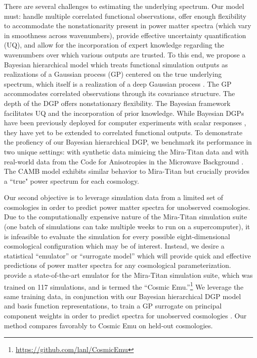 \documentclass[11pt]{article}
\begin{document}
There are several challenges to estimating the underlying spectrum.  Our model
must: handle multiple correlated functional observations, offer enough 
flexibility to accommodate the nonstationarity present in power matter spectra 
(which vary in smoothness across wavenumbers), provide effective uncertainty
quantification (UQ), and allow for the incorporation of expert knowledge 
regarding the wavenumbers over which various outputs are trusted.  To this end, 
we propose a Bayesian hierarchical model which treats functional simulation 
outputs as realizations of a Gaussian process (GP) 
centered on the true underlying spectrum, which itself is a realization of a deep Gaussian process 
\citep[DGP;][]{damianou2013deep}.  The GP accommodates correlated observations
through its covariance structure.  The depth of the DGP offers nonstationary
flexibility.  The Bayesian framework facilitates UQ and the incorporation of prior
knowledge.  While Bayesian DGPs have been previously deployed for computer experiments 
with scalar responses \citep[e.g.,][]{sauer2023active,sauer2023vecchia,ming2023deep}, 
they have yet to be extended to correlated functional outputs. 
To demonstrate the profiency of our Bayesian hierarchical DGP, 
we benchmark its performance in two unique settings: with synthetic data 
mimicing the Mira-Titan data and with real-world data from 
the Code for Anisotropies in the Microwave Background \citep[CAMB;][]{lewis2011CAMB}.
The CAMB model exhibits similar behavior to Mira-Titan but crucially
provides a ``true" power spectrum for each cosmology.

Our second objective is to leverage simulation data from a limited set of
cosmologies in order to predict power matter spectra for unobserved cosmologies.
Due to the computationally expensive nature of the Mira-Titan simulation suite
(one batch of simulations can take multiple weeks to run on a supercomputer),
it is infeasible to evaluate the simulation for every possible eight-dimensional
cosmological configuration which may be of interest.  Instead, we desire
a statistical ``emulator'' or ``surrogate model'' 
\citep{santner2003design,gramacy2020surrogates} which will provide quick and effective
predictions of power matter spectra for any cosmological parameterization.
\citet{moran2023mira} provide a state-of-the-art emulator for the Mira-Titan
simulation suite, which was trained on 117 simulations, and is termed 
the ``Cosmic Emu.''\footnote{\url{https://github.com/lanl/CosmicEmu}}
We leverage the same training data, in conjunction with our Bayesian hierarchical
DGP model and basis function representations, to train a GP surrogate 
on principal component weights in order to predict spectra for unobserved
cosmologies \citep{higdon2008computer, higdon2010estcosmo}. 
Our method compares favorably to Cosmic Emu on held-out cosmologies.
\end{document}
